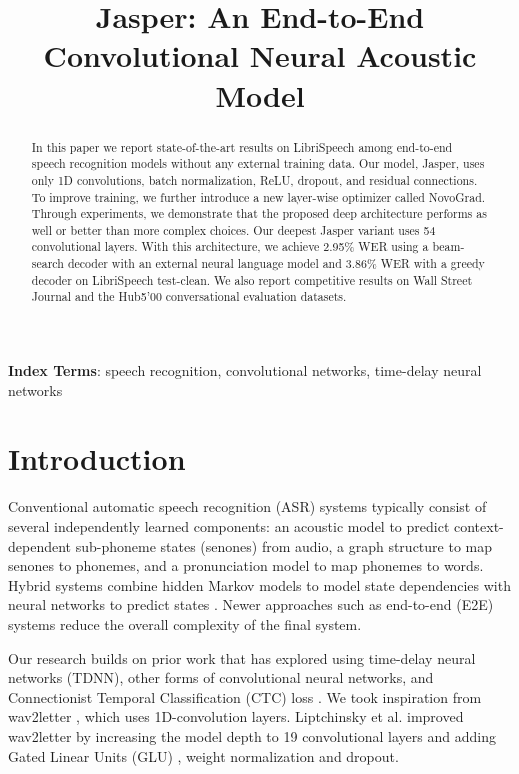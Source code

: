 \documentclass[a4paper]{article}
\title{Jasper: An End-to-End Convolutional Neural Acoustic Model}
\begin{document}
\maketitle

\begin{abstract}
In this paper we report state-of-the-art results on LibriSpeech among end-to-end speech recognition models without any external training data. Our model, Jasper, uses only 1D convolutions, batch normalization, ReLU, dropout, and residual connections. To improve training, we further introduce a new layer-wise optimizer called NovoGrad.
Through experiments, we demonstrate that the proposed deep architecture performs as well or better than more complex choices. Our deepest Jasper variant uses 54 convolutional layers. With this architecture, we achieve 2.95\% WER using a beam-search decoder with an external neural language model and 3.86\% WER with a greedy decoder on LibriSpeech test-clean. We also report competitive results on Wall Street Journal and the Hub5'00 conversational evaluation datasets.
\end{abstract}
\noindent\textbf{Index Terms}: speech recognition, convolutional networks, time-delay neural networks

\section{Introduction}
Conventional automatic speech recognition (ASR) systems typically consist of several independently learned components: an acoustic model to predict context-dependent sub-phoneme states (senones) from audio, a graph structure to map senones to phonemes, and a pronunciation model to map phonemes to words. Hybrid systems combine hidden Markov models to model state dependencies with neural networks to predict states \cite{Waibel1989, Bengio1992, Graves2005, Hinton2012}. Newer approaches such as end-to-end (E2E) systems reduce the overall complexity of the final system.

Our research builds on prior work that has explored using time-delay neural networks (TDNN), other forms of convolutional neural networks, and Connectionist Temporal Classification (CTC) loss \cite{graves2006, Zhang2016, collobert2016}. We took inspiration from wav2letter \cite{collobert2016}, which uses 1D-convolution layers. Liptchinsky et al. \cite{liptchinsky2017based} improved wav2letter by increasing the model depth to 19 convolutional layers and adding Gated Linear Units (GLU) \cite{Dauphin2017GLU}, weight normalization \cite{Salimans2016WeightNorm} and dropout.
\end{document}
